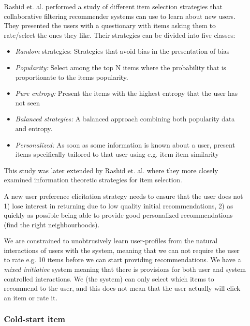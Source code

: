 Rashid et. al. \cite{Rashid2002} performed a study of different item selection strategies that collaborative filtering recommender systems can use to learn about new users. They presented the users with a questionary with items asking them to rate/select the ones they like. Their strategies can be divided into five classes:

\begin{itemize}
\item \emph{Random} strategies: Strategies that avoid bias in the presentation of bias
\item \emph{Popularity:} Select among the top N items where the probability that is proportionate to the items popularity.
\item \emph{Pure entropy:} Present the items with the highest entropy that the user has not seen
\item \emph{Balanced strategies:} A balanced approach combining both popularity data and entropy.
\item \emph{Personalized:} As soon as some information is known about a user, present items specifically tailored to that user using e.g. item-item similarity
\end{itemize}

This study was later extended by Rashid et. al. \cite{Rashid2008} where they more closely examined information theoretic strategies for item selection.


A new user preference elicitation strategy needs to ensure that the user does not 1) lose interest in returning due to low quality initial recommendations, 2) as quickly as possible being able to provide good personalized recommendations (find the right neighbourhoods).

We are constrained to unobtrusively learn user-profiles from the natural interactions of users with the system, meaning that we can not require the user to rate e.g. 10 items before we can start providing recommendations. We have a \emph{mixed initiative} system meaning that there is provisions for both user and system controlled interactions. We (the system) can only select which items to recommend to the user, and this does not mean that the user actually will click an item or rate it.

\subsubsection{Cold-start item}

